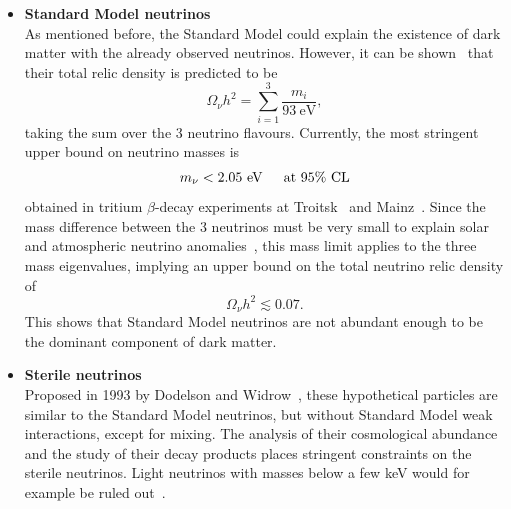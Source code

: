 \begin{itemize}
 \item[] \textbf{Standard Model neutrinos}\\
	As mentioned before, the Standard Model could explain the existence of dark matter with the already observed neutrinos. However, it can be shown~\cite{Bergstrom:2000pn} that their total relic density is predicted to be 
	\begin{equation}
	 \Omega_{\nu}h^2 = \sum_{i = 1}^3 \frac{m_i}{93\ \mathrm{eV}},
	\end{equation}
	taking the sum over the 3 neutrino flavours. Currently, the most stringent upper bound on neutrino masses is
	\begin{equation}
	 m_{\nu} < 2.05\ \text{eV \hspace{.3cm} at 95\% CL}
	\end{equation}
	obtained in tritium $\beta$-decay experiments at Troitsk~\cite{Lobashev:2003kt,Aseev:2011dq} and Mainz~\cite{Kraus:2004zw}. Since the mass difference between the 3 neutrinos must be very small to explain solar and atmospheric neutrino anomalies~\cite{GonzalezGarcia:2002dz}, this mass limit applies to the three mass eigenvalues, implying an upper bound on the total neutrino relic density of 
	\begin{equation}
	  \Omega_{\nu}h^2 \lesssim 0.07.
	\end{equation}
	This shows that Standard Model neutrinos are not abundant enough to be the dominant component of dark matter.
	
 \item[] \textbf{Sterile neutrinos}\\
         Proposed in 1993 by Dodelson and Widrow~\cite{Dodelson:1993je}, these hypothetical particles are similar to the Standard Model neutrinos, but without Standard Model weak interactions, except for mixing. The analysis of their cosmological abundance and the study of their decay products places stringent constraints on the sterile neutrinos. Light neutrinos with masses below a few keV would for example be ruled out~\cite{Yoshida:2003rm}.
         

\end{itemize}
